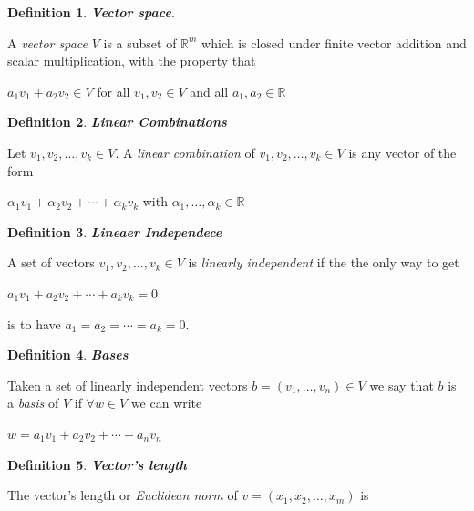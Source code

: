 \documentclass[a4paper,12pt]{report}
\newtheorem{definition}{Definition}[section]
\newcommand{\R}{\mathbb{R}}
\begin{document}
\begin{definition}
    \textbf{Vector space}.
\end{definition}
A \textit{vector space} $V$ is a subset of $\R^{m}$ which is closed under finite vector addition and scalar multiplication, with the property that

\begin{center}
   $a_1v_1 + a_2v_2 \in V$ for all $v_1,v_2 \in V$ and all $a_1,a_2 \in \R$
\end{center}

\begin{definition}
    \textbf{Linear Combinations}
\end{definition}

Let $v_1,v_2,\ldots,v_k \in V$. A \textit{linear combination} of $v_1,v_2,\ldots,v_k \in V$ is any vector of the form

\begin{center}
    $\alpha_1v_1 + \alpha_2v_2 + \cdots + \alpha_kv_k$ with $\alpha_1, \ldots, \alpha_k \in \R$
\end{center}

\begin{definition}
    \textbf{Lineaer Independece}
\end{definition}

A set of vectors $v_1,v_2,\ldots,v_k \in V$ is \textit{linearly independent} if the the only way to get

\begin{center}
    $a_1v_1 + a_2v_2 + \cdots + a_kv_k = 0$
\end{center}

is to have $a_1 = a_2 = \cdots = a_k = 0$.

\begin{definition}
    \textbf{Bases}
\end{definition}

Taken a set of linearly independent vectors $b = (v_1,\ldots,v_n) \in V$ we say that $b$ is a \textit{basis} of $V$ if $\forall w \in V$ we can write

\begin{center}
    $w = a_1v_1 + a_2v_2 + \cdots + a_nv_n$
\end{center}

\begin{definition}
    \textbf{Vector's length}
\end{definition}

The vector's length or \textit{Euclidean norm} of $v = (x_1, x_2, \ldots, x_m)$ is
\end{document}
